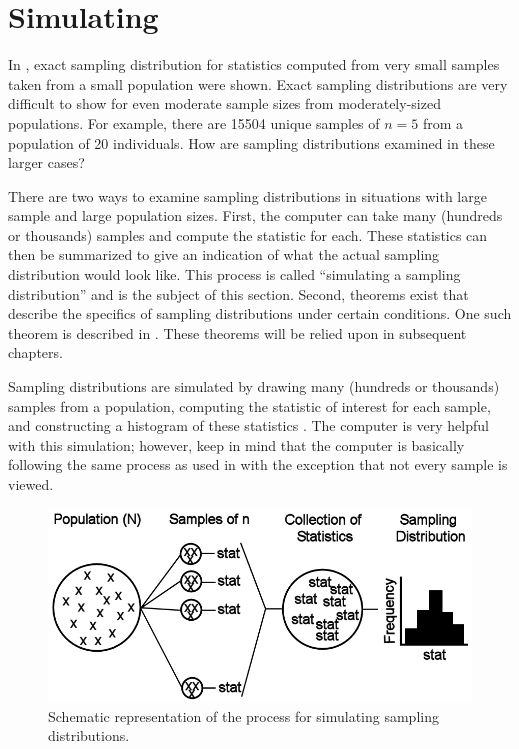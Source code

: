 \documentclass[10pt,openany]{book}\usepackage[]{graphicx}\usepackage[]{color}
\begin{document}


\vspace{-12pt}
\section{Simulating}  \label{sect:SDSimulate}
\vspace{-12pt}
In , exact sampling distribution for statistics computed from very small samples taken from a small population were shown.  Exact sampling distributions are very difficult to show for even moderate sample sizes from moderately-sized populations.  For example, there are 15504 unique samples of $n=5$ from a population of 20 individuals.  How are sampling distributions examined in these larger cases?

There are two ways to examine sampling distributions in situations with large sample and large population sizes.  First, the computer can take many (hundreds or thousands) samples and compute the statistic for each.  These statistics can then be summarized to give an indication of what the actual sampling distribution would look like.  This process is called ``simulating a sampling distribution'' and is the subject of this section.  Second, theorems exist that describe the specifics of sampling distributions under certain conditions.  One such theorem is described in .  These theorems will be relied upon in subsequent chapters.


Sampling distributions are simulated by drawing many (hundreds or thousands) samples from a population, computing the statistic of interest for each sample, and constructing a histogram of these statistics .  The computer is very helpful with this simulation; however, keep in mind that the computer is basically following the same process as used in  with the exception that not every sample is viewed.

\begin{figure}[htbp]
  \centering
    \includegraphics[width=4.5in]{Figs/Sampling_Distribution_Scheme.png}
  \caption{Schematic representation of the process for simulating sampling distributions.}
  \label{fig:SamplingDistributionScheme}
\end{figure}
\end{document}
